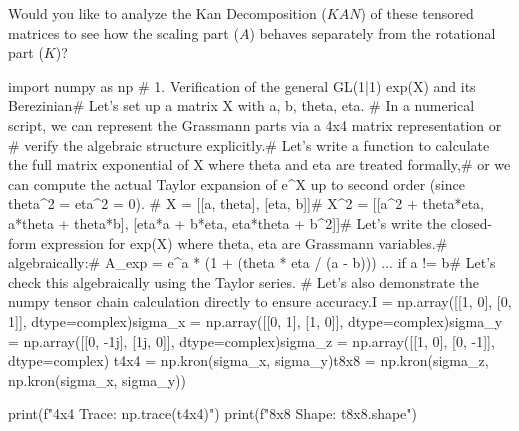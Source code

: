 Would you like to analyze the Kan Decomposition ($KAN$) of these tensored matrices to see how the scaling part ($A$) behaves separately from the rotational part ($K$)?

import numpy as np
# 1. Verification of the general GL(1|1) exp(X) and its Berezinian# Let's set up a matrix X with a, b, theta, eta. # In a numerical script, we can represent the Grassmann parts via a 4x4 matrix representation or # verify the algebraic structure explicitly.# Let's write a function to calculate the full matrix exponential of X where theta and eta are treated formally,# or we can compute the actual Taylor expansion of e^X up to second order (since theta^2 = eta^2 = 0).
# X = [[a, theta], [eta, b]]# X^2 = [[a^2 + theta*eta, a*theta + theta*b], [eta*a + b*eta, eta*theta + b^2]]# Let's write the closed-form expression for exp(X) where theta, eta are Grassmann variables.# algebraically:# A_exp = e^a * (1 + (theta * eta / (a - b))) ... if a != b# Let's check this algebraically using the Taylor series.
# Let's also demonstrate the numpy tensor chain calculation directly to ensure accuracy.I = np.array([[1, 0], [0, 1]], dtype=complex)sigma_x = np.array([[0, 1], [1, 0]], dtype=complex)sigma_y = np.array([[0, -1j], [1j, 0]], dtype=complex)sigma_z = np.array([[1, 0], [0, -1]], dtype=complex)
t4x4 = np.kron(sigma_x, sigma_y)t8x8 = np.kron(sigma_z, np.kron(sigma_x, sigma_y))

print(f"4x4 Trace: {np.trace(t4x4)}")
print(f"8x8 Shape: {t8x8.shape}")


